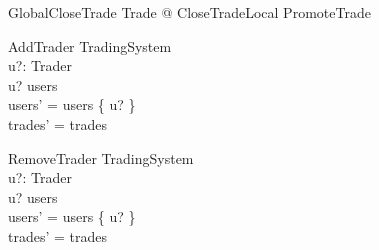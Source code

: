 \documentclass{article}
\begin{document}
\begin{zed}
GlobalCloseTrade  \exists \Delta Trade @ CloseTradeLocal \land PromoteTrade \\
\end{zed}

\begin{schema}{AddTrader}
\Delta TradingSystem \\
u?: Trader \\ 
\where
u? \notin users \\
users' = users \cup \{ u? \} \\
trades' = trades \\
\end{schema}
\vspace{-0.6cm} 
\begin{schema}{RemoveTrader}
\Delta TradingSystem \\
u?: Trader \\ 
\where
u? \in users \\
users' = users \setminus \{ u? \} \\
trades' = trades \\
\end{schema}

\pagebreak
\vspace{-0.6cm} 
\end{document}

